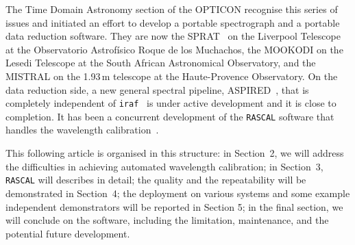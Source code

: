 \documentclass{aa}
\begin{document}
The Time Domain Astronomy section of the OPTICON recognise this series of issues and
initiated an effort to develop a portable spectrograph and a portable data reduction
software. They are now the SPRAT~\citep{2014SPIE.9147E..8HP} on the Liverpool
Telescope~\citep{2004SPIE.5489..679S} at the Observatorio Astrof{\'i}sico Roque de los
Muchachos, the MOOKODI on the Lesedi Telescope 
at the South African Astronomical Observatory, and the MISTRAL on the 1.93\,m
telescope at the Haute-Provence Observatory. On the data reduction side, a new
general spectral pipeline, ASPIRED~\citep{2020arXiv201203505L, 2020zndo...4306065L},
that is completely independent of \texttt{iraf}~\citep{1986SPIE..627..733T} is under
active development and it is close to completion. It has been a concurrent development
of the \texttt{RASCAL} software that handles the wavelength
calibration~\citep{2019arXiv191205883V, 2020zndo...4117517V}.

This following article is organised in this structure: in Section~2, we will address
the difficulties in achieving automated wavelength calibration; in Section~3,
\texttt{RASCAL} will describes in detail; the quality and the repeatability will
be demonstrated in Section~4; the deployment on various systems and some example
independent demonstrators will be reported in Section 5; in the final section, we
will conclude on the software, including the limitation, maintenance, and the potential
future development.
\end{document}
